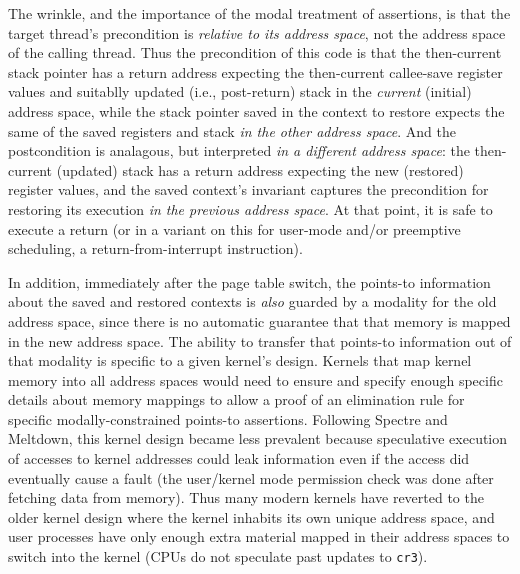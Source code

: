 The wrinkle, and the importance of the modal treatment of assertions, is that the target thread's precondition is \emph{relative to its address space}, not the address space of the calling thread.
Thus the precondition of this code is that the then-current stack pointer has a return address expecting the then-current callee-save register values and suitablly updated (i.e., post-return) stack in the \emph{current} (initial) address space, while the stack pointer saved in the context to restore expects the same of the saved registers and stack \emph{in the other address space}. And the postcondition is analagous, but interpreted \emph{in a different address space}: the then-current (updated) stack has a return address expecting the new (restored) register values, and the saved context's invariant captures the precondition for restoring its execution \emph{in the previous address space}. At that point, it is safe to execute a return (or in a variant on this for user-mode and/or preemptive scheduling, a return-from-interrupt instruction).

In addition, immediately after the page table switch, the points-to information about the saved and restored contexts is \emph{also} guarded by a modality for the old address space, since there is no automatic guarantee that that memory is mapped in the new address space.  The ability to transfer that points-to information out of that modality is specific to a given kernel's design. Kernels that map kernel memory into all address spaces would need to ensure and specify enough specific details about memory mappings to allow a proof of an elimination rule for specific modally-constrained points-to assertions.
Following Spectre and Meltdown, this kernel design became less prevalent because speculative execution of accesses to kernel addresses could leak information even if the access did eventually cause a fault (the user/kernel mode permission check was done after fetching data from memory). Thus many modern kernels have reverted to the older kernel design where the kernel inhabits its own unique address space, and user processes have only enough extra material mapped in their address spaces to switch into the kernel (CPUs do not speculate past updates to \texttt{cr3}).


